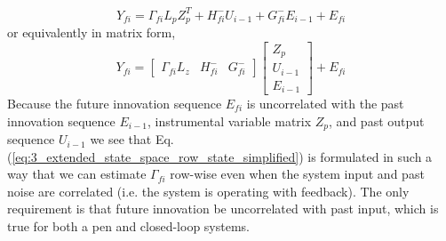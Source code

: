 \begin{equation}\label{eq:3_extended_state_space_row_state_simplified}
Y_{fi} = \Gamma_{fi}L_p Z_p^T + H_{fi}^- U_{i-1} + G_{fi}^- E_{i-1} + E_{fi}
\end{equation}
or equivalently in matrix form,
\begin{equation}
Y_{fi} = \begin{bmatrix}\Gamma_{fi}L_z & H_{fi}^- & G_{fi}^-\end{bmatrix}
\begin{bmatrix}Z_p\\ U_{i-1}\\ E_{i-1}\end{bmatrix} + E_{fi}
\end{equation}
Because the future innovation sequence $E_{fi}$ is uncorrelated with the past innovation sequence $E_{i-1}$, instrumental variable matrix $Z_p$, and past output sequence $U_{i-1}$ we see that Eq. (\ref{eq:3_extended_state_space_row_state_simplified}) is formulated in such a way that we can estimate $\Gamma_{fi}$ row-wise even when the system input and past noise are correlated (i.e. the system is operating with feedback). The only requirement is that future innovation be uncorrelated with past input, which is true for both a pen and closed-loop systems. 

